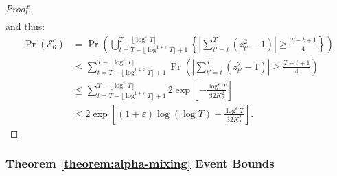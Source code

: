 \begin{proof}
\begin{align*}
\end{align*}
\normalsize
and thus:
\small
\begin{align*}
    \Pr(\mathcal{E}^c_6) &= \Pr\left(\bigcup_{t = T - \lfloor\log^{1+\varepsilon} T\rfloor + 1}^{T - \lfloor\log^{\varepsilon} T\rfloor}  \left\{\left|\sum_{t'=t}^T (z^2_{t'}-1)\right| \geq \frac{T-t+1}{4}\right\} \right) \\
    &\leq \sum_{t = T - \lfloor\log^{1+\varepsilon} T\rfloor + 1}^{T - \lfloor\log^{\varepsilon} T\rfloor}  \Pr\left(\left|\sum_{t'=t}^T (z^2_{t'}-1)\right| \geq \frac{T-t+1}{4}\right) \tag{union bound} \\
    &\leq \sum_{t = T - \lfloor\log^{1+\varepsilon} T\rfloor + 1}^{T - \lfloor\log^{\varepsilon} T\rfloor}   2 \exp\left[-\frac{\log^\varepsilon T}{32K^2_2}\right]  \\
    &\leq2 \exp\left[(1+\varepsilon)\log(\log T)-\frac{\log^\varepsilon T}{32K^2_2}\right]. 
\end{align*}
\normalsize
\end{proof}

\subsubsection{Theorem \ref{theorem:alpha-mixing} Event Bounds}

